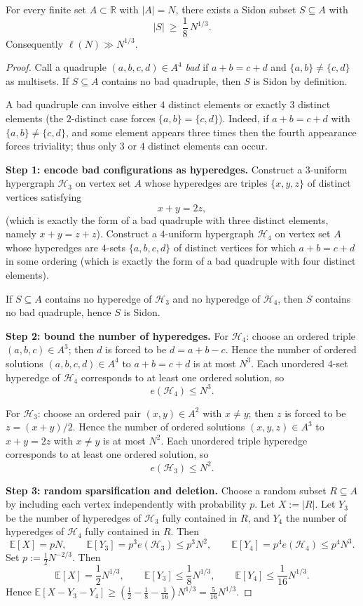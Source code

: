 \begin{lemma}\label{lem:530-lower}
For every finite set $A\subset\mathbb R$ with $|A|=N$, there exists a Sidon subset $S\subseteq A$ with
\[
|S|\ \ge\ \frac1{8}\,N^{1/3}.
\]
Consequently $\ell(N)\gg N^{1/3}$.
\end{lemma}
\begin{proof}
Call a quadruple $(a,b,c,d)\in A^4$ \emph{bad} if $a+b=c+d$ and $\{a,b\}\ne\{c,d\}$ as multisets. If $S\subseteq A$ contains no bad quadruple, then $S$ is Sidon by definition.

A bad quadruple can involve either $4$ distinct elements or exactly $3$ distinct elements (the $2$-distinct case forces $\{a,b\}=\{c,d\}$). Indeed, if $a+b=c+d$ with $\{a,b\}\ne\{c,d\}$, and some element appears three times then the fourth appearance forces triviality; thus only $3$ or $4$ distinct elements can occur.

\medskip
\noindent\textbf{Step 1: encode bad configurations as hyperedges.}
Construct a $3$-uniform hypergraph $\mathcal H_3$ on vertex set $A$ whose hyperedges are triples $\{x,y,z\}$ of distinct vertices satisfying
\[
x+y=2z,
\]
(which is exactly the form of a bad quadruple with three distinct elements, namely $x+y=z+z$).
Construct a $4$-uniform hypergraph $\mathcal H_4$ on vertex set $A$ whose hyperedges are $4$-sets $\{a,b,c,d\}$ of distinct vertices for which $a+b=c+d$ in some ordering (which is exactly the form of a bad quadruple with four distinct elements).

If $S\subseteq A$ contains no hyperedge of $\mathcal H_3$ and no hyperedge of $\mathcal H_4$, then $S$ contains no bad quadruple, hence $S$ is Sidon.

\medskip
\noindent\textbf{Step 2: bound the number of hyperedges.}
For $\mathcal H_4$: choose an ordered triple $(a,b,c)\in A^3$; then $d$ is forced to be $d=a+b-c$. Hence the number of ordered solutions $(a,b,c,d)\in A^4$ to $a+b=c+d$ is at most $N^3$. Each unordered $4$-set hyperedge of $\mathcal H_4$ corresponds to at least one ordered solution, so
\[
e(\mathcal H_4)\le N^3.
\]

For $\mathcal H_3$: choose an ordered pair $(x,y)\in A^2$ with $x\ne y$; then $z$ is forced to be $z=(x+y)/2$. Hence the number of ordered solutions $(x,y,z)\in A^3$ to $x+y=2z$ with $x\ne y$ is at most $N^2$. Each unordered triple hyperedge corresponds to at least one ordered solution, so
\[
e(\mathcal H_3)\le N^2.
\]

\medskip
\noindent\textbf{Step 3: random sparsification and deletion.}
Choose a random subset $R\subseteq A$ by including each vertex independently with probability $p$. Let $X:=|R|$. Let $Y_3$ be the number of hyperedges of $\mathcal H_3$ fully contained in $R$, and $Y_4$ the number of hyperedges of $\mathcal H_4$ fully contained in $R$. Then
\[
\mathbb E[X]=pN,\qquad \mathbb E[Y_3]=p^3 e(\mathcal H_3)\le p^3 N^2,\qquad \mathbb E[Y_4]=p^4 e(\mathcal H_4)\le p^4 N^3.
\]
Set $p:=\frac12 N^{-2/3}$. Then
\[
\mathbb E[X]=\frac12 N^{1/3},\qquad \mathbb E[Y_3]\le \frac18 N^{1/3},\qquad \mathbb E[Y_4]\le \frac1{16} N^{1/3}.
\]
Hence $\mathbb E[X-Y_3-Y_4]\ge \left(\frac12-\frac18-\frac1{16}\right)N^{1/3}=\frac5{16}N^{1/3}$.


\end{proof}
